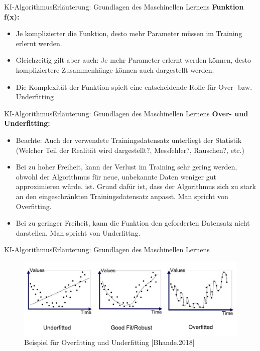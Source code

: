 \documentclass[169, handout	]{THIbeamer} %
\begin{document}
	\begin{frame}{KI-Algorithmus}{Erläuterung: Grundlagen des Maschinellen Lernens}
		\textbf{Funktion f(x):}
		\begin{itemize}
			\item Je komplizierter die Funktion, desto mehr Parameter müssen im Training erlernt werden.
			\item Gleichzeitig gilt aber auch: Je mehr Parameter erlernt werden können, desto kompliziertere Zusammenhänge können auch dargestellt werden. 
			\item Die Komplexität der Funktion spielt eine entscheidende Rolle für Over- bzw. Underfitting
		\end{itemize}
	\end{frame}
	\begin{frame}{KI-Algorithmus}{Erläuterung: Grundlagen des Maschinellen Lernens}
		\textbf{Over- und Underfitting:}		
		\begin{itemize}
			\item Beachte: Auch der verwendete Trainingsdatensatz unterliegt der Statistik (Welcher Teil der Realität wird dargestellt?, Messfehler?, Rauschen?, etc.)		
			\item Bei zu hoher Freiheit, kann der Verlust im Training sehr gering werden, obwohl der Algorithmus für neue, unbekannte Daten weniger gut approximieren würde. ist. Grund dafür ist, dass der Algorithmus sich zu stark an den eingeschränkten Trainingsdatensatz anpasst. Man spricht von Overfitting.
			\item Bei zu geringer Freiheit, kann die Funktion den geforderten Datensatz nicht darstellen. Man spricht von Underfittng.
		\end{itemize}
	\end{frame}
	\begin{frame}{KI-Algorithmus}{Erläuterung: Grundlagen des Maschinellen Lernens}
		\vspace{1 cm}		
		\begin{figure}
			\includegraphics[scale=0.3]{required/Over and Underfitting.png}
			\caption{Beispiel für Overfitting und Underfitting [Bhande.2018]}
        	\label{Over and Underfitting}
		\end{figure}
	\end{frame}
\end{document}
